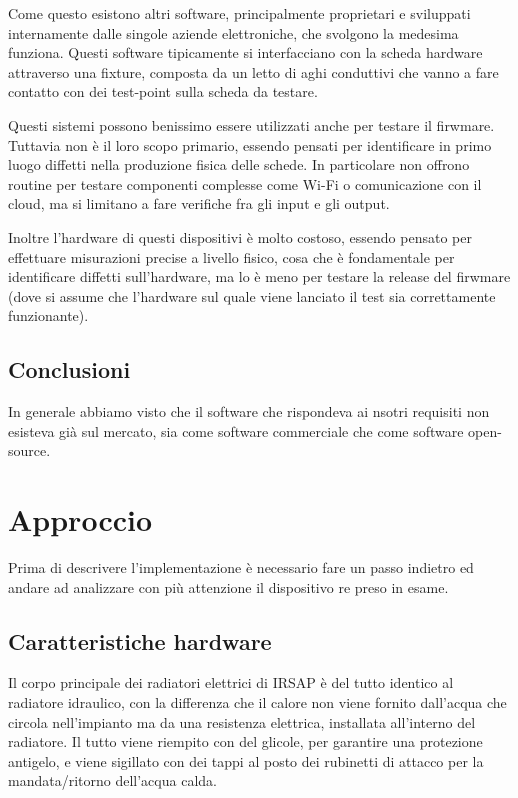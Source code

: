\documentclass[12pt,a4paper,twoside,titlepage]{book}
\begin{document}
Come questo esistono altri software, principalmente proprietari e sviluppati internamente dalle singole
aziende elettroniche, che svolgono la medesima funziona. Questi software tipicamente si interfacciano
con la scheda hardware attraverso una fixture, composta da un letto di aghi conduttivi che vanno a
fare contatto con dei test-point sulla scheda da testare.

Questi sistemi possono benissimo essere utilizzati anche per testare il firwmare. Tuttavia non è
il loro scopo primario, essendo pensati per identificare in primo luogo diffetti nella produzione
fisica delle schede. In particolare non offrono routine per testare componenti complesse come Wi-Fi o comunicazione con il
cloud, ma si limitano a fare verifiche fra gli input e gli output.

Inoltre l'hardware di questi dispositivi è molto costoso, essendo pensato per effettuare misurazioni
precise a livello fisico, cosa che è fondamentale per identificare diffetti sull'hardware, ma lo è
meno per testare la release del firwmare (dove si assume che l'hardware sul quale viene lanciato il test
sia correttamente funzionante).

\section{Conclusioni}

In generale abbiamo visto che il software che rispondeva ai nsotri requisiti non esisteva già sul mercato,
sia come software commerciale che come software open-source.

\chapter{Approccio}

Prima di descrivere l'implementazione è necessario fare un passo indietro ed andare
ad analizzare con più attenzione il dispositivo \Gls{re} preso in esame.

\section{Caratteristiche hardware}

Il corpo principale dei radiatori elettrici di IRSAP è del tutto identico al radiatore idraulico,
con la differenza che il calore non viene fornito dall'acqua che circola nell'impianto ma da una 
resistenza elettrica, installata all'interno del radiatore. Il tutto viene riempito con del glicole,
per garantire una protezione antigelo, e viene sigillato con dei tappi al posto dei rubinetti di 
attacco per la mandata/ritorno dell'acqua calda.  
\end{document}
